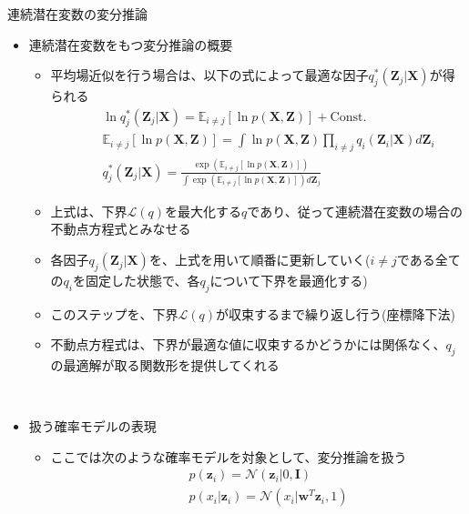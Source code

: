 \documentclass[dvipdfmx,notheorems,t]{beamer}
\begin{document}
\begin{frame}{連続潜在変数の変分推論}

\begin{itemize}
	\item 連続潜在変数をもつ変分推論の概要
	\begin{itemize}
		\item 平均場近似を行う場合は、以下の式によって最適な因子$q_j^*(\bm{Z}_j | \bm{X})$が得られる
		\begin{eqnarray}
			&& \ln q_j^*(\bm{Z}_j | \bm{X}) = \mathbb{E}_{i \neq j} \left[ \ln p(\bm{X}, \bm{Z}) \right] + \mathrm{Const.} \\
			&& \mathbb{E}_{i \neq j} \left[ \ln p(\bm{X}, \bm{Z}) \right] = \int \ln p(\bm{X}, \bm{Z}) \prod_{i \neq j} q_i(\bm{Z}_i | \bm{X}) d\bm{Z}_i \\
			&& q_j^*(\bm{Z}_j | \bm{X}) = \frac{\exp \left( \mathbb{E}_{i \neq j} \left[ \ln p(\bm{X}, \bm{Z}) \right] \right)}{\displaystyle \int \exp \left( \mathbb{E}_{i \neq j} \left[ \ln p(\bm{X}, \bm{Z}) \right] \right) d\bm{Z}_j}
		\end{eqnarray}
		
		\item 上式は、下界$\mathcal{L}(q)$を最大化する$q$であり、従って連続潜在変数の場合の\alert{不動点方程式}とみなせる
		\item 各因子$q_j(\bm{Z}_j | \bm{X})$を、上式を用いて順番に更新していく(\color{red}$i \neq j$である全ての$q_i$を固定\normalcolor した状態で、各$q_j$について下界を最適化する)
		\item このステップを、下界$\mathcal{L}(q)$が収束するまで繰り返し行う(座標降下法)
		\newline
		
		\item 不動点方程式は、下界が最適な値に\alert{収束するかどうかには関係なく}、\color{red}$q_j$の最適解が取る関数形を提供\normalcolor してくれる
	\end{itemize} \
	
	\item 扱う確率モデルの表現
	\begin{itemize}
		\item ここでは次のような確率モデルを対象として、変分推論を扱う
		\begin{eqnarray}
			&& p(\bm{z}_i) = \mathcal{N}(\bm{z}_i | 0, \bm{I}) \\
			&& p(x_i | \bm{z}_i) = \mathcal{N}(x_i | \bm{w}^T \bm{z}_i, 1)
		\end{eqnarray}
		

\end{itemize}
\end{itemize}
\end{frame}
\end{document}
